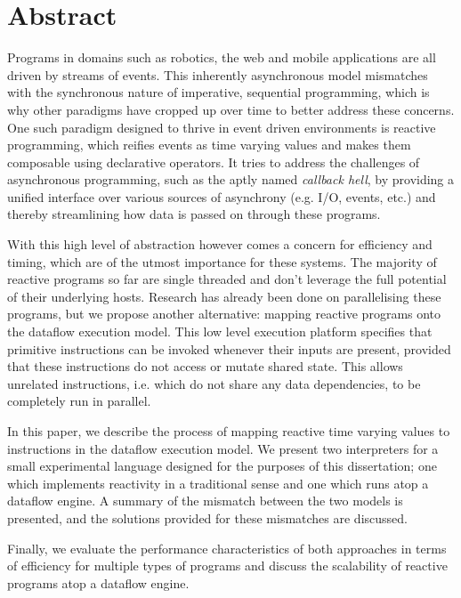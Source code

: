 \section*{Abstract}

Programs in domains such as robotics, the web and mobile applications are all driven by streams of events. This inherently asynchronous model mismatches with the synchronous nature of imperative, sequential programming, which is why other paradigms have cropped up over time to better address these concerns. One such paradigm designed to thrive in event driven environments is reactive programming, which reifies events as time varying values and makes them composable using declarative operators. It tries to address the challenges of asynchronous programming, such as the aptly named \textit{callback hell}, by providing a unified interface over various sources of asynchrony (e.g. I/O, events, etc.) and thereby streamlining how data is passed on through these programs.

With this high level of abstraction however comes a concern for efficiency and timing, which are of the utmost importance for these systems. The majority of reactive programs so far are single threaded and don't leverage the full potential of their underlying hosts.  Research has already been done on parallelising these programs, but we propose another alternative: mapping reactive programs onto the dataflow execution model. This low level execution platform specifies that primitive instructions can be invoked whenever their inputs are present, provided that these instructions do not access or mutate shared state. This allows unrelated instructions, i.e. which do not share any data dependencies, to be completely run in parallel.

In this paper, we describe the process of mapping reactive time varying values to instructions in the dataflow execution model. We present two interpreters for a small experimental language designed for the purposes of this dissertation; one which implements reactivity in a traditional sense and one which runs atop a dataflow engine. 
A summary of the mismatch between the two models is presented, and the solutions provided for these mismatches are discussed. 

Finally, we evaluate the performance characteristics of both approaches in terms of efficiency for multiple types of programs and discuss the scalability of reactive programs atop a dataflow engine.
            